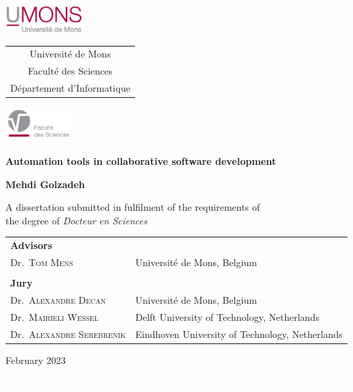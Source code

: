 \thispagestyle{empty}

\includegraphics[width=8em]{Figures/UMONS}  
\hfill
\begin{tabular}[b]{c}
{\small Université de Mons}\\
{\small Faculté des Sciences}\\
{\small Département d'Informatique}
\end{tabular}
\hfill
\includegraphics[width=7em]{Figures/FS}

\begin{center}

\vfill

{\bf \LARGE Automation tools in collaborative software development} \\ %

\bigskip

{\Large \bf Mehdi Golzadeh}\\

\bigskip

A dissertation submitted in fulfilment of the requirements of\\
the degree of {\em Docteur en Sciences}


\vfill

\begin{center}
\begin{small}

\begin{tabular}{l l}

{\bf Advisors}\\
Dr.\ \textsc{Tom Mens} &  Université de Mons, Belgium\\
\\
{\bf Jury}\\
Dr.\ \textsc{Alexandre Decan} & Université de Mons, Belgium \\
Dr.\ \textsc{Mairieli Wessel} & Delft University of Technology, Netherlands\\
Dr.\ \textsc{Alexandre Serebrenik} & Eindhoven University of Technology, Netherlands
\end{tabular}
\end{small}

\vfill

February 2023 
\end{center}

\end{center}
\thispagestyle{empty}

\thispagestyle{empty}
\newpage
\textcolor{white}{.}

